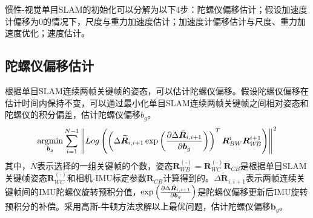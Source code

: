 惯性-视觉单目SLAM的初始化可以分解为以下4步：陀螺仪偏移估计；假设加速度计偏移为0的情况下，尺度与重力加速度估计；加速度计偏移估计与尺度、重力加速度优化；速度估计。

\subsection{陀螺仪偏移估计}
根据单目SLAM连续两帧关键帧的姿态，可以估计陀螺仪偏移。假设陀螺仪偏移在估计时间内保持不变，可以通过最小化单目SLAM连续两帧关键帧之间相对姿态和陀螺仪的积分偏差，估计陀螺仪偏移$b_g$。
\begin{equation}
\label{equ5.28}
\operatorname*{argmin}\limits_{\boldsymbol{b}_g}\sum\limits_{i=1}^{N-1} \left \Vert Log \left( \left( \Delta \widetilde{\boldsymbol{R}}_{i,i+1} \exp \left( { \partial \Delta \bar{\boldsymbol{R}}_{i,i+1} \over \partial \boldsymbol{b}_g  } \right) \right)^T \boldsymbol{R}_{BW}^i \boldsymbol{R}_{W\!B}^{i+1} \right)  \right \Vert^2
\end{equation}
其中，$N$表示选择的一组关键帧的个数，姿态$\boldsymbol{R}_{W\!B}^{(\cdot)}=\boldsymbol{R}_{WC}^{(\cdot)}\boldsymbol{R}_{CB}$是根据单目SLAM关键帧姿态$\boldsymbol{R}_{WC}^{(\cdot)}$和相机-IMU标定参数$\boldsymbol{R}_{CB}$计算得到的。$\Delta \widetilde{\boldsymbol{R}}_{i,i+1}$表示两帧连续关键帧间的IMU陀螺仪旋转预积分值，$\exp \left( { \partial \Delta \bar{\boldsymbol{R}}_{i,i+1} \over \partial \boldsymbol{b}_g  } \right)$是陀螺仪偏移更新后IMU旋转预积分的补偿。采用高斯-牛顿方法求解以上最优问题，估计陀螺仪偏移$\boldsymbol{b}_g$。


